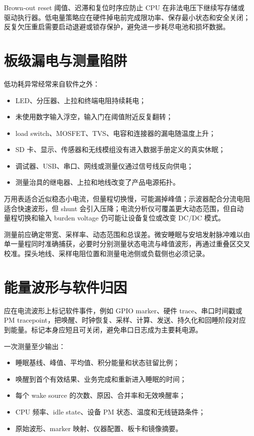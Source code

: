 Brown-out reset 阈值、迟滞和复位时序应防止 CPU 在非法电压下继续写存储或驱动执行器。低电量策略应在硬件掉电前完成限功率、保存最小状态和安全关闭；反复欠压重启需要启动退避或锁存保护，避免进一步耗尽电池和损坏数据。

\section{板级漏电与测量陷阱}

低功耗异常经常来自软件之外：

\begin{itemize}
  \item LED、分压器、上拉和终端电阻持续耗电；
  \item 未使用数字输入浮空，输入门在阈值附近反复翻转；
  \item load switch、MOSFET、TVS、电容和连接器的漏电随温度上升；
  \item SD 卡、显示、传感器和无线模组没有进入数据手册定义的真实休眠；
  \item 调试器、USB、串口、网线或测量仪通过信号线反向供电；
  \item 测量治具的继电器、上拉和地线改变了产品电源拓扑。
\end{itemize}

万用表适合近似稳态小电流，但量程切换慢，可能漏掉峰值；示波器配合分流电阻适合快速波形，但 shunt 会引入压降；电流分析仪可覆盖更大动态范围，但自动量程切换和输入 burden voltage 仍可能让设备复位或改变 DC/DC 模式。

测量前应确定带宽、采样率、动态范围和总误差。微安睡眠与安培发射脉冲难以由单一量程同时准确捕获，必要时分别测量状态电流与峰值波形，再通过重叠区交叉校准。探头地线、采样电阻位置和测量电池侧或负载侧也必须记录。

\section{能量波形与软件归因}

应在电流波形上标记软件事件，例如 GPIO marker、硬件 trace、串口时间戳或 PM tracepoint，把唤醒、时钟恢复、采样、计算、发送、持久化和回睡阶段对应到能量。标记本身应短且可关闭，避免串口日志成为主要耗电源。

一次测量至少输出：

\begin{itemize}
  \item 睡眠基线、峰值、平均值、积分能量和状态驻留比例；
  \item 唤醒到首个有效结果、业务完成和重新进入睡眠的时间；
  \item 每个 wake source 的次数、原因、合并率和无效唤醒率；
  \item CPU 频率、idle state、设备 PM 状态、温度和无线链路条件；
  \item 原始波形、marker 映射、仪器配置、板卡和镜像摘要。
\end{itemize}

